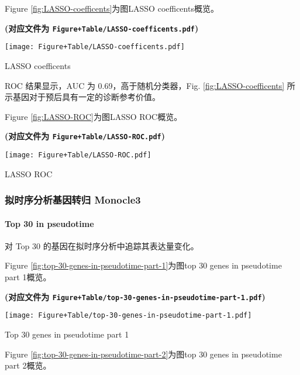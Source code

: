 \documentclass[
]{article}
\begin{document}
Figure \ref{fig:LASSO-coefficents}为图LASSO coefficents概览。

\textbf{(对应文件为 \texttt{Figure+Table/LASSO-coefficents.pdf})}

\def\@captype{figure}
\begin{center}
\texttt{[image: Figure+Table/LASSO-coefficents.pdf]}
\caption{LASSO coefficents}\label{fig:LASSO-coefficents}
\end{center}

ROC 结果显示，AUC 为 0.69，高于随机分类器，Fig. \ref{fig:LASSO-coefficents} 所示基因对于预后具有一定的诊断参考价值。

Figure \ref{fig:LASSO-ROC}为图LASSO ROC概览。

\textbf{(对应文件为 \texttt{Figure+Table/LASSO-ROC.pdf})}

\def\@captype{figure}
\begin{center}
\texttt{[image: Figure+Table/LASSO-ROC.pdf]}
\caption{LASSO ROC}\label{fig:LASSO-ROC}
\end{center}

\hypertarget{ux62dfux65f6ux5e8fux5206ux6790ux57faux56e0ux8f6cux5f52-monocle3}{%
\subsubsection{拟时序分析基因转归 Monocle3}\label{ux62dfux65f6ux5e8fux5206ux6790ux57faux56e0ux8f6cux5f52-monocle3}}

\hypertarget{top30p}{%
\paragraph{Top 30 in pseudotime}\label{top30p}}

对 Top 30 的基因在拟时序分析中追踪其表达量变化。

Figure \ref{fig:top-30-genes-in-pseudotime-part-1}为图top 30 genes in pseudotime part 1概览。

\textbf{(对应文件为 \texttt{Figure+Table/top-30-genes-in-pseudotime-part-1.pdf})}

\def\@captype{figure}
\begin{center}
\texttt{[image: Figure+Table/top-30-genes-in-pseudotime-part-1.pdf]}
\caption{Top 30 genes in pseudotime part 1}\label{fig:top-30-genes-in-pseudotime-part-1}
\end{center}

Figure \ref{fig:top-30-genes-in-pseudotime-part-2}为图top 30 genes in pseudotime part 2概览。
\end{document}
